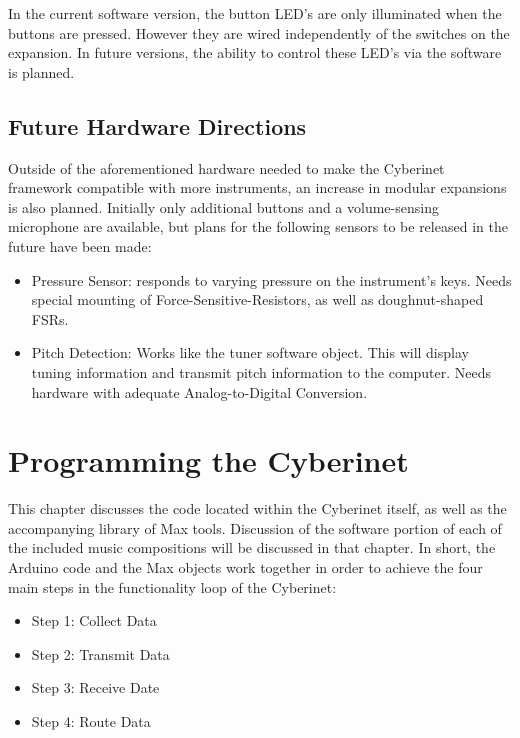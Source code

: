In the current software version, the button LED's are only illuminated when the buttons are pressed. However they are wired independently of the switches on the expansion. In future versions, the ability to control these LED's via the software is planned.


\section{Future Hardware Directions}
Outside of the aforementioned hardware needed to make the Cyberinet framework compatible with more instruments, an increase in modular expansions is also planned. Initially only additional buttons and a volume-sensing microphone are available, but plans for the following sensors to be released in the future have been made:

\begin{itemize}
    \item Pressure Sensor: responds to varying pressure on the instrument's keys. Needs special mounting of Force-Sensitive-Resistors, as well as doughnut-shaped FSRs.
    \item Pitch Detection: Works like the tuner software object. This will display tuning information and transmit pitch information to the computer. Needs hardware with adequate Analog-to-Digital Conversion.
\end{itemize}





\chapter{Programming the Cyberinet}
This chapter discusses the code located within the Cyberinet itself, as well as the accompanying library of Max tools. Discussion of the software portion of each of the included music compositions will be discussed in that chapter. In short, the Arduino code and the Max objects work together in order to achieve the four main steps in the functionality loop of the Cyberinet:

\begin{itemize}
    \item Step 1: Collect Data
    \item Step 2: Transmit Data
    \item Step 3: Receive Date
    \item Step 4: Route Data
\end{itemize}

